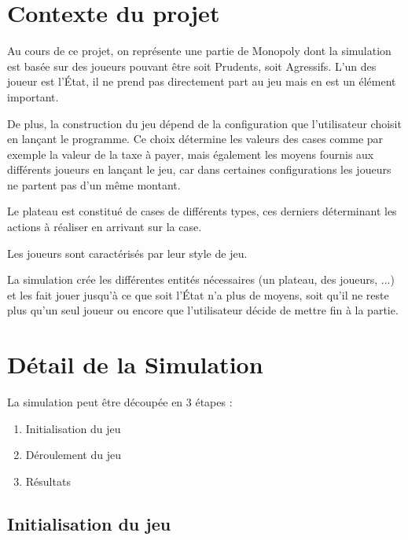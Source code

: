 \documentclass[11pt, a4paper]{report}
\begin{document}
	
	\tableofcontents
	
	
	\chapter{Contexte du projet}
	
	Au cours de ce projet, on représente une partie de Monopoly dont la simulation est basée sur des joueurs pouvant être soit Prudents, soit Agressifs. L'un des joueur est l'État, il ne prend pas directement part au jeu mais en est un élément important.
	
	De plus, la construction du jeu dépend de la configuration que l'utilisateur choisit en lançant le programme. Ce choix détermine les valeurs des cases comme par exemple la valeur de la taxe à payer, mais également les moyens fournis aux différents joueurs en lançant le jeu, car dans certaines configurations les joueurs ne partent pas d'un même montant.
	
	Le plateau est constitué de cases de différents types, ces derniers déterminant les actions à réaliser en arrivant sur la case.
	
	Les joueurs sont caractérisés par leur style de jeu.
	
	La simulation crée les différentes entités nécessaires (un plateau, des joueurs, ...) et les fait jouer jusqu'à ce que soit l'État n'a plus de moyens, soit qu'il ne reste plus qu'un seul joueur ou encore que l'utilisateur décide de mettre fin à la partie.
	
	
	
	\chapter{Détail de la Simulation}
	
	La simulation peut être découpée en 3 étapes :
	
	\begin{enumerate}
		
		\item Initialisation du jeu
		
		\item Déroulement du jeu
		
		\item Résultats
	
	\end{enumerate}
	
	
	\section{Initialisation du jeu}
	
\end{document}
